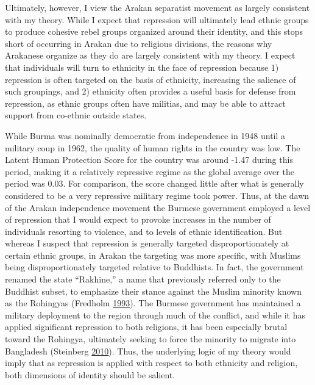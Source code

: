 \documentclass[12pt,]{book}
\theoremstyle{definition}
\theoremstyle{definition}
\theoremstyle{definition}
\theoremstyle{remark}
\begin{document}
Ultimately, however, I view the Arakan separatist movement as largely
consistent with my theory. While I expect that repression will
ultimately lead ethnic groups to produce cohesive rebel groups organized
around their identity, and this stops short of occurring in Arakan due
to religious divisions, the reasons why Arakanese organize as they do
are largely consistent with my theory. I expect that individuals will
turn to ethnicity in the face of repression because 1) repression is
often targeted on the basis of ethnicity, increasing the salience of
such groupings, and 2) ethnicity often provides a useful basis for
defense from repression, as ethnic groups often have militias, and may
be able to attract support from co-ethnic outside states.

While Burma was nominally democratic from independence in 1948 until a
military coup in 1962, the quality of human rights in the country was
low. The Latent Human Protection Score for the country was around -1.47
during this period, making it a relatively repressive regime as the
global average over the period was 0.03. For comparison, the score
changed little after what is generally considered to be a very
repressive military regime took power. Thus, at the dawn of the Arakan
independence movement the Burmese government employed a level of
repression that I would expect to provoke increases in the number of
individuals resorting to violence, and to levels of ethnic
identification. But whereas I suspect that repression is generally
targeted disproportionately at certain ethnic groups, in Arakan the
targeting was more specific, with Muslims being disproportionately
targeted relative to Buddhists. In fact, the government renamed the
state ``Rakhine,'' a name that previously referred only to the Buddhist
subset, to emphasize their stance against the Muslim minority known as
the Rohingyas (Fredholm \protect\hyperlink{ref-Fredholm1993}{1993}). The
Burmese government has maintained a military deployment to the region
through much of the conflict, and while it has applied significant
repression to both religions, it has been especially brutal toward the
Rohingya, ultimately seeking to force the minority to migrate into
Bangladesh (Steinberg \protect\hyperlink{ref-Steinberg2010}{2010}).
Thus, the underlying logic of my theory would imply that as repression
is applied with respect to both ethnicity and religion, both dimensions
of identity should be salient.
\end{document}
